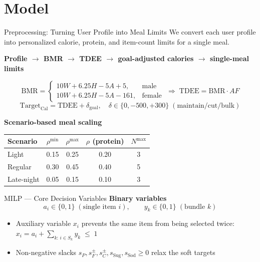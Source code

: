 \documentclass[10pt,aspectratio=169]{beamer}
\begin{document}
\section{Model}
\begin{frame}{Preprocessing: Turning User Profile into Meal Limits}
We convert each user profile into personalized calorie, protein, and item-count limits for a single meal.
\begin{center}
\setlength{\fboxsep}{6pt}
\colorbox{green!10}{\color{green!45!black}\textbf{Profile $\to$ BMR $\to$ TDEE $\to$ goal-adjusted calories $\to$ single-meal limits}}
\end{center}
\[
\text{BMR} = \begin{cases}10W+6.25H-5A+5, & \text{male}\\10W+6.25H-5A-161, & \text{female}\end{cases}
\;\Rightarrow\; \text{TDEE} = \text{BMR}\cdot AF
\]
\[
\text{Target}_{\text{Cal}} = \text{TDEE} + \delta_{\text{goal}},\quad
\delta\in\{0,-500,+300\}\;(\text{maintain/cut/bulk})
\]
\begin{center}
\textbf{Scenario-based meal scaling}\\[3pt]
\begin{tabular}{lcccc}
\toprule
Scenario & $\rho^{\min}$ & $\rho^{\max}$ & $\rho$ (protein) & $N^{\max}$ \\
\midrule
Light & 0.15 & 0.25 & 0.20 & 3 \\
Regular & 0.30 & 0.45 & 0.40 & 5 \\
Late-night & 0.05 & 0.15 & 0.10 & 3 \\
\bottomrule
\end{tabular}
\end{center}
\end{frame}

\begin{frame}{MILP --- Core Decision Variables}
\textbf{Binary variables}
\[
a_i \in \{0,1\}\;(\text{single item } i),\qquad
y_k \in \{0,1\}\;(\text{bundle } k)
\]
\begin{itemize}
  \item Auxiliary variable $x_i$ prevents the same item from being selected twice:
  \(\displaystyle x_i = a_i + \sum_{k:\,i\in S_k} y_k \;\le\; 1\)
  \item Non-negative slacks $s_P, s^{\pm}_{F}, s^{\pm}_{C}, s_{\text{Sug}}, s_{\text{Sod}} \ge 0$ relax the soft targets
\end{itemize}
\end{frame}
\end{document}
